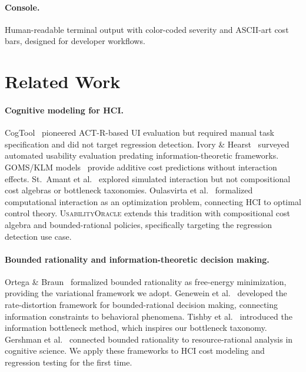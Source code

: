 \documentclass[11pt,twocolumn]{article}
\theoremstyle{definition}
\newcommand{\tool}{\textsc{UsabilityOracle}}
\begin{document}
\paragraph{Console.}
Human-readable terminal output with color-coded severity and ASCII-art cost bars, designed for developer workflows.

\section{Related Work}
\label{sec:related}

\paragraph{Cognitive modeling for HCI.}
CogTool~\citep{john2005cogtool} pioneered ACT-R-based UI evaluation but required manual task specification and did not target regression detection.
Ivory \& Hearst~\citep{ivory2001state} surveyed automated usability evaluation predating information-theoretic frameworks.
GOMS/KLM models~\citep{card1983psychology} provide additive cost predictions without interaction effects.
St.\ Amant et al.~\citep{stamant2004simulated} explored simulated interaction but not compositional cost algebras or bottleneck taxonomies.
Oulasvirta et al.~\citep{oulasvirta2018computational} formalized computational interaction as an optimization problem, connecting HCI to optimal control theory.
\tool{} extends this tradition with compositional cost algebra and bounded-rational policies, specifically targeting the regression detection use case.

\paragraph{Bounded rationality and information-theoretic decision making.}
Ortega \& Braun~\citep{ortega2013thermodynamics} formalized bounded rationality as free-energy minimization, providing the variational framework we adopt.
Genewein et al.~\citep{genewein2015bounded} developed the rate-distortion framework for bounded-rational decision making, connecting information constraints to behavioral phenomena.
Tishby et al.~\citep{tishby2000information} introduced the information bottleneck method, which inspires our bottleneck taxonomy.
Gershman et al.~\citep{gershman2015computational} connected bounded rationality to resource-rational analysis in cognitive science.
We apply these frameworks to HCI cost modeling and regression testing for the first time.
\end{document}
